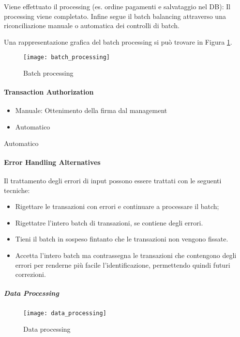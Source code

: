 Viene effettuato il processing (es. ordine pagamenti e salvataggio nel DB):
Il processing viene completato.
Infine segue il batch balancing attraverso 
una riconciliazione manuale o automatica dei controlli di batch.

Una rappresentazione grafica del batch processing si può trovare in 
Figura \ref{fig:security:batch:processing}.
\begin{figure}[h!]
        \begin{center}
                \texttt{[image: batch\_processing]}
        \end{center}
        \caption{Batch processing}
        \label{fig:security:batch:processing}
\end{figure}

\paragraph{Transaction Authorization}
\begin{itemize}
	\item Manuale: Ottenimento della firma dal management 
	\item Automatico
\end{itemize}

Automatico

\paragraph{Error Handling Alternatives}
Il trattamento degli errori di input possono essere trattati
con le seguenti tecniche:
\begin{itemize}
\item Rigettare le transazioni con errori e continuare a processare 
il batch;
\item Rigettatre l'intero batch di transazioni, se contiene
degli errori.
\item Tieni il batch in sospeso fintanto che le transazioni 
non vengono fissate.
\item Accetta l'intero batch ma contrassegna le transazioni che
contengono degli errori per renderne più facile l'identificazione,
permettendo quindi futuri correzioni.
\end{itemize}


\subparagraph{Data Processing}

\begin{figure}[h!]
        \begin{center}
                \texttt{[image: data\_processing]}
        \end{center}
        \caption{Data processing}
        \label{fig:data:processing}
\end{figure}

